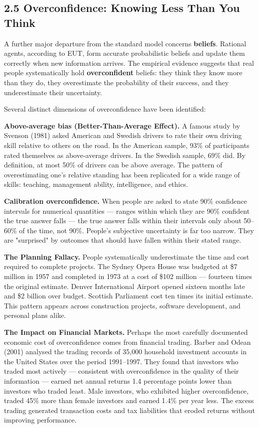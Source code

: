 \documentclass[12pt, letterpaper]{article}
\begin{document}
\medskip


\subsection{2.5 Overconfidence: Knowing Less Than You Think}


A further major departure from the standard model concerns \textbf{beliefs}. Rational agents, according to EUT, form accurate probabilistic beliefs and update them correctly when new information arrives. The empirical evidence suggests that real people systematically hold \textbf{overconfident} beliefs: they think they know more than they do, they overestimate the probability of their success, and they underestimate their uncertainty.

Several distinct dimensions of overconfidence have been identified:

\textbf{Above-average bias (Better-Than-Average Effect).} A famous study by Svenson (1981) asked American and Swedish drivers to rate their own driving skill relative to others on the road. In the American sample, 93\% of participants rated themselves as above-average drivers. In the Swedish sample, 69\% did. By definition, at most 50\% of drivers can be above average. The pattern of overestimating one's relative standing has been replicated for a wide range of skills: teaching, management ability, intelligence, and ethics.

\textbf{Calibration overconfidence.} When people are asked to state 90\% confidence intervals for numerical quantities --- ranges within which they are 90\% confident the true answer falls --- the true answer falls within their intervals only about 50--60\% of the time, not 90\%. People's subjective uncertainty is far too narrow. They are "surprised" by outcomes that should have fallen within their stated range.

\textbf{The Planning Fallacy.} People systematically underestimate the time and cost required to complete projects. The Sydney Opera House was budgeted at \$7 million in 1957 and completed in 1973 at a cost of \$102 million --- fourteen times the original estimate. Denver International Airport opened sixteen months late and \$2 billion over budget. Scottish Parliament cost ten times its initial estimate. This pattern appears across construction projects, software development, and personal plans alike.

\textbf{The Impact on Financial Markets.} Perhaps the most carefully documented economic cost of overconfidence comes from financial trading. Barber and Odean (2001) analysed the trading records of 35,000 household investment accounts in the United States over the period 1991--1997. They found that investors who traded most actively --- consistent with overconfidence in the quality of their information --- earned net annual returns 1.4 percentage points lower than investors who traded least. Male investors, who exhibited higher overconfidence, traded 45\% more than female investors and earned 1.4\% per year less. The excess trading generated transaction costs and tax liabilities that eroded returns without improving performance.
\end{document}
